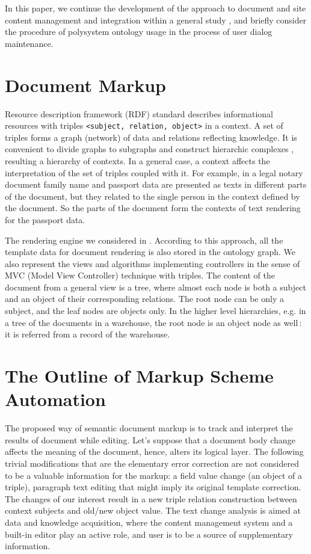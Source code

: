 \documentclass[conference]{IEEEtran}
\begin{document}
In this paper, we continue the development of the approach
\cite{prevwork} to document and site content management and
integration within a general study \cite{b2:15}, and briefly consider
the procedure of polysystem ontology usage in the process of user
dialog maintenance.

\section{Document Markup}

Resource description framework (RDF) standard describes informational
resources with triples \texttt{<subject, relation, object>} in a
context.  A set of triples forms a graph (network) of data and
relations reflecting knowledge.  It is convenient to divide graphs to
subgraphs and construct hierarchic complexes \cite{b2:15}, resulting a
hierarchy of contexts.  In a general case, a context affects the
interpretation of the set of triples coupled with it.  For example, in
a legal notary document family name and passport data are presented as
texts in different parts of the document, but they related to the
single person in the context defined by the document.  So the parts of
the document form the contexts of text rendering for the passport
data.

The rendering engine we considered in \cite{prevwork}.  According to
this approach, all the template data for document rendering is also
stored in the ontology graph.  We also represent the views and
algorithms implementing controllers in the sense of MVC (Model View
Controller) \cite{b2:5} technique with triples.  The content
of the document from a general view is a tree, where almost each node
is both a subject and an object of their corresponding relations.  The
root node can be only a subject, and the leaf nodes are objects only.
In the higher level hierarchies, e.g. in a tree of the documents in a
warehouse, the root node is an object node as well\,: it is referred
from a record of the warehouse.

\section{The Outline of Markup Scheme Automation}
\label{sec:scheme}

The proposed way of semantic document markup is to track and interpret
the results of document while editing.  Let's suppose that a document
body change affects the meaning of the document, hence, alters its
logical layer.  The following trivial modifications that are the
elementary error correction are not considered to be a valuable
information for the markup: a field value change (an object of a
triple), paragraph text editing that might imply its original template
correction.  The changes of our interest result in a new triple
relation construction between context subjects and old/new object
value.  The text change analysis is aimed at data and knowledge
acquisition, where the content management system and a built-in editor
play an active role, and user is to be a source of supplementary
information.
\end{document}
